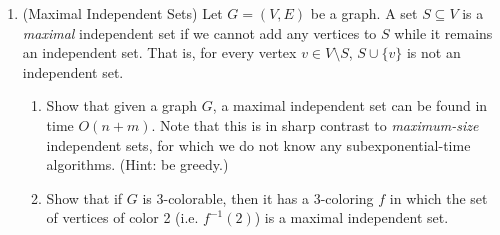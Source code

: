 \documentclass[11pt]{article}
\begin{document}
\begin{enumerate}
\begin{enumerate}
\begin{figure} [H]
    \end{figure}


    \end{enumerate}


 \item (Maximal Independent Sets) \label{prob:maximalIS} Let $G=(V,E)$ be a graph.  A set $S\subseteq V$ is a {\em maximal} independent set if we cannot add any vertices to $S$ while it remains an independent set.  That is, for every vertex $v\in V\setminus S$, $S\cup\{v\}$ is not an independent set.
    \begin{enumerate}
        \item Show that given a graph $G$, a maximal independent set can be found in time $O(n+m)$.  Note that this is in sharp contrast to {\em maximum-size} independent sets, for which we do not know any subexponential-time algorithms. (Hint: be greedy.)
        
        \item Show that if $G$ is 3-colorable, then it has a 3-coloring $f$ in which the set of vertices of color 2 (i.e. $f^{-1}(2)$) is a maximal independent set.


\end{enumerate}
\end{enumerate}
\end{document}
